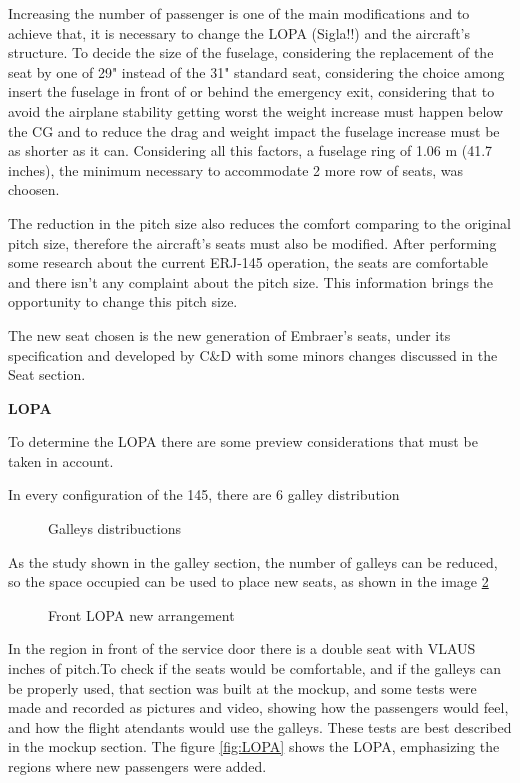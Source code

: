﻿%
Increasing the number of passenger is one of the main modifications and to achieve that, it is necessary to change the LOPA (Sigla!!) and the aircraft's structure. To decide the size of the fuselage, considering the replacement of the seat by one of 29" instead of the 31" standard seat, considering the choice among insert the fuselage in front of or behind the emergency exit, considering that to avoid the airplane stability getting worst the weight increase must happen below the CG and to reduce the drag and weight impact the fuselage increase must be as shorter as it can. Considering all this factors, a fuselage ring of 1.06 m (41.7 inches), the minimum necessary to accommodate 2 more row of seats, was choosen.


The reduction in the pitch size also reduces the comfort comparing to the original pitch size, therefore the aircraft's seats must also be modified. After performing some research about the current ERJ-145 operation, the seats are comfortable and there isn't any complaint about the pitch size. This information brings the opportunity to change this pitch size.

The new seat chosen is the new generation of Embraer's seats, under its specification and developed by C\&D with some minors changes discussed in the Seat section.\cite{SlimSeat}

\textbf{LOPA}

To determine the LOPA there are some preview considerations that must be taken in account.

In every configuration of the 145, there are 6 galley distribution
\begin{figure}[H] %
\caption{Galleys distribuctions}
\label{fig:galleysdistribuction}
\end{figure}

As the study shown in the galley section, the number of galleys can be reduced, so the space occupied can be used to place new seats, as shown in the image \ref{fig:frontlopa}


\begin{figure}[H] %
\caption{Front LOPA new arrangement}
\label{fig:frontlopa}
\end{figure}

In the region in front of the service door there is a double seat with VLAUS inches of pitch.To check if the seats would be comfortable, and if the galleys can be properly used, that section was built at the mockup, and some tests were made and recorded as pictures and video, showing how the passengers would feel, and how the flight atendants would use the galleys. These tests are best described in the mockup section.
The figure \ref{fig:LOPA} shows the LOPA, emphasizing the regions where new passengers were added.

